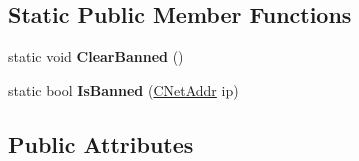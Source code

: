 \subsection*{Static Public Member Functions}
\begin{DoxyCompactItemize}
\item 
\mbox{\label{class_c_node_ad75b43ab81213b74446163211c24246a}} 
static void {\bfseries Clear\+Banned} ()
\item 
\mbox{\label{class_c_node_aefa8b81afa53b4c6635dc4c6c024211a}} 
static bool {\bfseries Is\+Banned} (\mbox{\hyperlink{class_c_net_addr}{C\+Net\+Addr}} ip)
\end{DoxyCompactItemize}
\subsection*{Public Attributes}

